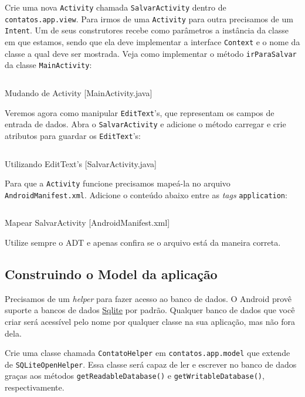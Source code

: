 Crie uma nova \texttt{Activity} chamada \texttt{SalvarActivity} dentro
de \texttt{contatos.app.view}. Para irmos de uma \texttt{Activity} para
outra precisamos de um \texttt{Intent}. Um de seus construtores recebe
como parâmetros a instância da classe em que estamos, sendo que ela deve
implementar a interface \texttt{Context} e o nome da classe a qual deve
ser mostrada. Veja como implementar o método \texttt{irParaSalvar} da
classe \texttt{MainActivity}:

\begin{listing}[H]
  \inputminted[linenos=true,frame=bottomline,tabsize=3]{ java }{ source/MainActivity-3.java }
  \caption{Mudando de Activity [MainActivity.java]}
\end{listing}

Veremos agora como manipular \texttt{EditText}'s, que representam os
campos de entrada de dados. Abra o \texttt{SalvarActivity} e adicione o
método carregar e crie atributos para guardar os \texttt{EditText}'s:

\begin{listing}[H]
  \inputminted[linenos=true,frame=bottomline,tabsize=3]{ java }{ source/SalvarActivity-1.java }
  \caption{Utilizando EditText's [SalvarActivity.java]}
\end{listing}

Para que a \texttt{Activity} funcione precisamos mapeá-la no arquivo
\texttt{AndroidManifest.xml}. Adicione o conteúdo abaixo entre as
\emph{tags} \texttt{application}:

\begin{listing}[H]
  \inputminted[linenos=true,frame=bottomline,tabsize=3]{ xml }{ source/AndroidManifest-2.xml }
  \caption{Mapear SalvarActivity [AndroidManifest.xml]}
\end{listing}

Utilize sempre o ADT e apenas confira se o arquivo está da maneira
correta.

\subsection{Construindo o Model da aplicação \label{ssec:model}}

Precisamos de um \emph{helper} para fazer acesso ao banco de dados. O
Android provê suporte a bancos de dados
\href{http://sqlite.org/}{Sqlite} por padrão. Qualquer banco de dados
que você criar será acessível pelo nome por qualquer classe na sua
aplicação, mas não fora dela.

Crie uma classe chamada \texttt{ContatoHelper} em
\texttt{contatos.app.model} que extende de \texttt{SQLiteOpenHelper}.
Essa classe será capaz de ler e escrever no banco de dados graças aos
métodos \texttt{getReadableDatabase()} e \texttt{getWritableDatabase()},
respectivamente.

